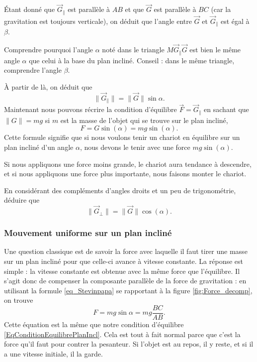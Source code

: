 \documentclass[a4paper,12pt]{book}
\theoremstyle{mes_exemples}	\newtheorem{exemple}[numtho]{Exemple}
\theoremstyle{mes_tho}
\newcommand{\fF}{\overrightarrow{F}}
\newcommand{\fG}{\overrightarrow{G}}
\begin{document}
Étant donné que $\fG_{\parallel}$ est parallèle à $AB$ et que $\fG$ est parallèle à $BC$ (car la gravitation est toujours verticale), on déduit que l'angle entre $\fG$ et $\fG_{\parallel}$ est égal à~$\beta$.

\begin{exercice}
Comprendre pourquoi l'angle $\alpha$ noté dans le triangle $M\fG_{\parallel}\fG$ est bien le même angle $\alpha$ que celui à la base du plan incliné. Conseil : dans le même triangle, comprendre l'angle $\beta$.
\end{exercice}

À partir de là, on déduit que 
\begin{equation}				\label{eq_Stevinpapa}
	\| \fG_{\parallel} \|=\| \fG \|\sin\alpha.
\end{equation}
Maintenant nous pouvons récrire la condition d'équilibre $\fF=\fG_{\parallel}$ en sachant que $\| G \|=mg$ si $m$ est la masse de l'objet qui se trouve sur le plan incliné,
\begin{equation}			\label{EqConditionEquilibrePlanIncl}
	F=G\sin(\alpha)=mg\sin(\alpha).
\end{equation}
Cette formule signifie que si nous voulons tenir un chariot en équilibre sur un plan incliné d'un angle $\alpha$, nous devons le tenir avec une force $mg\sin(\alpha)$.

Si nous appliquons une force moins grande, le chariot aura tendance à descendre, et si nous appliquons une force plus importante, nous faisons monter le chariot.

\begin{exercice}
En considérant des compléments d'angles droits et un peu de trigonométrie, déduire que
\[ 
	\| \fG_{\perp} \|=\| \fG \|\cos(\alpha).
\]
\end{exercice}


\subsubsection{Mouvement uniforme sur un plan incliné}
\label{sss_inclineF}

Une question classique est de savoir la force avec laquelle il faut tirer une masse sur un plan incliné pour que celle-ci avance à vitesse constante. La réponse est simple : la vitesse constante est obtenue avec la même force que l'équilibre. Il s'agit donc de compenser la composante parallèle de la force de gravitation : en utilisant la formule \eqref{eq_Stevinpapa} se rapportant à la figure \ref{fig:Force_decomp}, on trouve
\begin{equation} \label{eq_expunF}
	F=mg\sin\alpha=mg\frac{ BC }{ AB }.
\end{equation}
Cette équation est la même que notre condition d'équilibre \eqref{EqConditionEquilibrePlanIncl}. Cela est tout à fait normal parce que c'est la force qu'il faut pour contrer la pesanteur. Si l'objet est au repos, il y reste, et si il a une vitesse initiale, il la garde.
\end{document}
